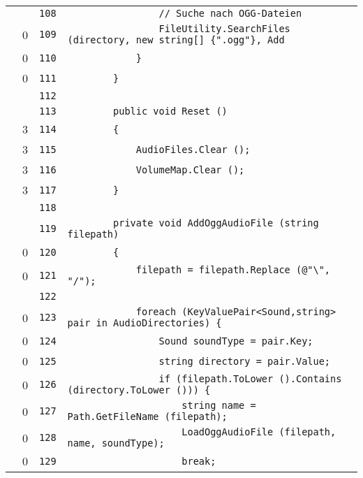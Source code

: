 \documentclass[a4paper,10pt]{article}
\begin{document}
\begin{longtable}[l]{lrrl}
\cellcolor{gray} &  & \verb~108~ & \verb~                // Suche nach OGG-Dateien~\\
\cellcolor{red} & 0 & \verb~109~ & \verb~                FileUtility.SearchFiles (directory, new string[] {".ogg"}, Add~\\
\cellcolor{red} & 0 & \verb~110~ & \verb~            }~\\
\cellcolor{red} & 0 & \verb~111~ & \verb~        }~\\
\cellcolor{gray} &  & \verb~112~ & \verb~~\\
\cellcolor{gray} &  & \verb~113~ & \verb~        public void Reset ()~\\
\cellcolor{green} & 3 & \verb~114~ & \verb~        {~\\
\cellcolor{green} & 3 & \verb~115~ & \verb~            AudioFiles.Clear ();~\\
\cellcolor{green} & 3 & \verb~116~ & \verb~            VolumeMap.Clear ();~\\
\cellcolor{green} & 3 & \verb~117~ & \verb~        }~\\
\cellcolor{gray} &  & \verb~118~ & \verb~~\\
\cellcolor{gray} &  & \verb~119~ & \verb~        private void AddOggAudioFile (string filepath)~\\
\cellcolor{red} & 0 & \verb~120~ & \verb~        {~\\
\cellcolor{red} & 0 & \verb~121~ & \verb~            filepath = filepath.Replace (@"\", "/");~\\
\cellcolor{gray} &  & \verb~122~ & \verb~~\\
\cellcolor{red} & 0 & \verb~123~ & \verb~            foreach (KeyValuePair<Sound,string> pair in AudioDirectories) {~\\
\cellcolor{red} & 0 & \verb~124~ & \verb~                Sound soundType = pair.Key;~\\
\cellcolor{red} & 0 & \verb~125~ & \verb~                string directory = pair.Value;~\\
\cellcolor{red} & 0 & \verb~126~ & \verb~                if (filepath.ToLower ().Contains (directory.ToLower ())) {~\\
\cellcolor{red} & 0 & \verb~127~ & \verb~                    string name = Path.GetFileName (filepath);~\\
\cellcolor{red} & 0 & \verb~128~ & \verb~                    LoadOggAudioFile (filepath, name, soundType);~\\
\cellcolor{red} & 0 & \verb~129~ & \verb~                    break;~\\

\end{longtable}
\end{document}
